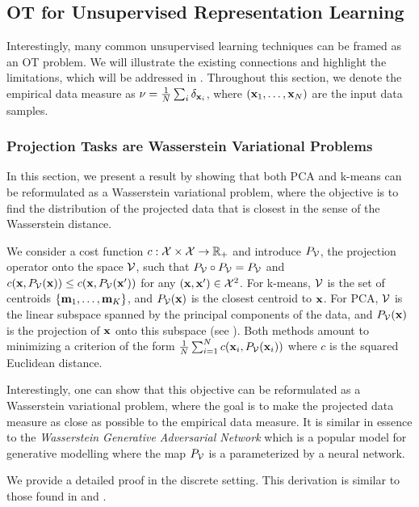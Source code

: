 \subsection{OT for Unsupervised Representation Learning}

Interestingly, many common unsupervised learning techniques can be framed as an OT problem. We will illustrate the existing connections and highlight the limitations, which will be addressed in . Throughout this section, we denote the empirical data measure as $\nu = \frac{1}{N} \sum_i \delta_{{\mathbf{x}}_i}$, where $({\mathbf{x}}_1, \ldots, {\mathbf{x}}_N)$ are the input data samples.

\subsubsection{Projection Tasks are Wasserstein Variational Problems}

In this section, we present a result by \citep{Canas12} showing that both PCA and k-means can be reformulated as a Wasserstein variational problem, where the objective is to find the distribution of the projected data that is closest in the sense of the Wasserstein distance. 

We consider a cost function $c : \mathcal{X} \times \mathcal{X} \to \mathbb{R}_+$ and introduce $P_{{\mathcal{V}}}$, the projection operator onto the space ${\mathcal{V}}$, such that $P_{{\mathcal{V}}} \circ P_{{\mathcal{V}}} = P_{{\mathcal{V}}}$ and $c({\mathbf{x}}, P_{{\mathcal{V}}}({\mathbf{x}})) \leq c({\mathbf{x}}, P_{{\mathcal{V}}}({\mathbf{x}}'))$ for any $({\mathbf{x}}, {\mathbf{x}}') \in {\mathcal{X}}^2$. For k-means, ${\mathcal{V}}$ is the set of centroids $\{{\mathbf{m}}_1, \ldots, {\mathbf{m}}_K\}$, and $P_{{\mathcal{V}}}({\mathbf{x}})$ is the closest centroid to ${\mathbf{x}}$. For PCA, ${\mathcal{V}}$ is the linear subspace spanned by the principal components of the data, and $P_{{\mathcal{V}}}({\mathbf{x}})$ is the projection of ${\mathbf{x}}$ onto this subspace (see ). Both methods amount to minimizing a criterion of the form $\frac{1}{N} \sum_{i=1}^N c({\mathbf{x}}_i, P_{{\mathcal{V}}}({\mathbf{x}}_i))$ where $c$ is the squared Euclidean distance.

Interestingly, one can show that this objective can be reformulated as a Wasserstein variational problem, where the goal is to make the projected data measure as close as possible to the empirical data measure. It is similar in essence to the \emph{Wasserstein Generative Adversarial Network} \citep{arjovsky2017wasserstein} which is a popular model for generative modelling where the map $P_{{\mathcal{V}}}$ is a parameterized by a neural network.

We provide a detailed proof in the discrete setting. This derivation is similar to those found in \citep{Canas12} and \citep{vayer2023controlling}.

